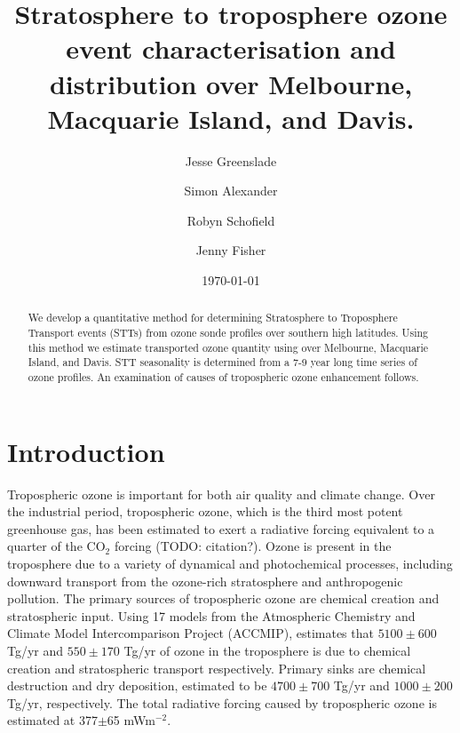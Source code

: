 \documentclass{article}
\begin{document}
\title{Stratosphere to troposphere ozone event characterisation and distribution over Melbourne, Macquarie Island, and Davis.}

\author[1]{Jesse Greenslade}
\author[2]{Simon Alexander}
\author[3,4]{Robyn Schofield}
\author[1,5]{Jenny Fisher}


\date{\today}



\maketitle 

\begin{abstract}
  We develop a quantitative method for determining Stratosphere to Troposphere Transport events (STTs) from ozone sonde profiles over southern high latitudes. 
  Using this method we estimate transported ozone quantity using over Melbourne, Macquarie Island, and Davis.
  STT seasonality is determined from a 7-9 year long time series of ozone profiles.
  An examination of causes of tropospheric ozone enhancement follows.
\end{abstract}%


\section{Introduction}

    Tropospheric ozone is important for both air quality and climate change. 
    Over the industrial period, tropospheric ozone, which is the third most potent greenhouse gas, has been estimated to exert a radiative forcing equivalent to a quarter of the CO$_2$ forcing (TODO: citation?). 
    Ozone is present in the troposphere due to a variety of dynamical and photochemical processes, including downward  transport from the ozone-rich stratosphere and anthropogenic pollution.
    The primary sources of tropospheric ozone are chemical creation and stratospheric input.
    Using 17 models from the Atmospheric Chemistry and Climate Model Intercomparison Project (ACCMIP), \citet{Stevenson2006} estimates that $5100\pm600$ Tg/yr and $550\pm170$ Tg/yr of ozone in the troposphere is due to chemical creation and stratospheric transport respectively.
    Primary sinks are chemical destruction and dry deposition, estimated to be $4700\pm700$ Tg/yr and $1000\pm200$ Tg/yr, respectively. 
    The total radiative forcing caused by tropospheric ozone is estimated at 377$\pm$65 mWm$^{-2}$.
\end{document}
